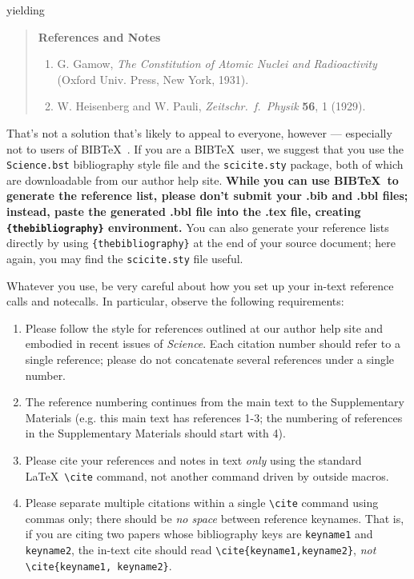 \documentclass[12pt]{article}
\begin{document}
\noindent yielding

\begin{quote}
{\bf References and Notes}

\begin{enumerate}
\item G. Gamow, {\it The Constitution of Atomic Nuclei and
Radioactivity\/} (Oxford Univ. Press, New York, 1931).
\item W. Heisenberg and W. Pauli, {\it Zeitschr.\ f.\ Physik} {\bf 56},
1 (1929).
\end{enumerate}
\end{quote}


That's not a solution that's likely to appeal to everyone, however ---
especially not to users of B{\small{IB}}\TeX\ \cite{inclme}.  If you
are a B{\small{IB}}\TeX\ user, we suggest that you use the
\texttt{Science.bst} bibliography style file and the
\texttt{scicite.sty} package, both of which are downloadable from our author help site.
{\bf While you can use B{\small{IB}}\TeX\ to generate the reference list, please don't submit 
your .bib and .bbl files; instead, paste the generated .bbl file into the .tex file, creating
 \texttt{\{thebibliography\}} environment.}
 You can also
generate your reference lists directly by using 
\texttt{\{thebibliography\}} at the end of your source document; here
again, you may find the \texttt{scicite.sty} file useful.

Whatever you use, be
very careful about how you set up your in-text reference calls and
notecalls.  In particular, observe the following requirements:

\begin{enumerate}
\item Please follow the style for references outlined at our author
  help site and embodied in recent issues of {\it Science}.  Each
  citation number should refer to a single reference; please do not
  concatenate several references under a single number.
\item The reference numbering  continues from the 
main text to the Supplementary Materials (e.g. this main 
text has references 1-3; the numbering of references in the 
Supplementary Materials should start with 4). 
\item Please cite your references and notes in text {\it only\/} using
  the standard \LaTeX\ \verb+\cite+ command, not another command
  driven by outside macros.
\item Please separate multiple citations within a single \verb+\cite+
  command using commas only; there should be {\it no space\/}
  between reference keynames.  That is, if you are citing two
  papers whose bibliography keys are \texttt{keyname1} and
  \texttt{keyname2}, the in-text cite should read
  \verb+\cite{keyname1,keyname2}+, {\it not\/}
  \verb+\cite{keyname1, keyname2}+.
\end{enumerate}
\end{document}
